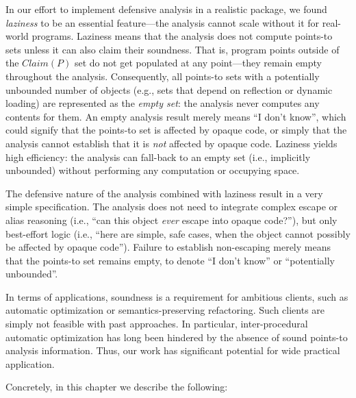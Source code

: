 In our effort to implement defensive analysis in a realistic package, we found \emph{laziness} to be an essential feature---the analysis cannot scale without it for real-world programs. Laziness means that the analysis does not compute points-to sets unless it can also claim their soundness. That is, program points outside of the $Claim(P)$ set do not get populated at any point---they remain empty throughout the analysis. Consequently, all points-to sets with a potentially unbounded number of objects (e.g., sets that depend on reflection or dynamic loading) are represented as the \emph{empty set}: the analysis never computes any contents for them. An empty analysis result merely means ``I don't know'', which could signify that the points-to set is affected by opaque code, or simply that the analysis cannot establish that it is \emph{not} affected by opaque code. Laziness yields high efficiency: the analysis can fall-back to an empty set (i.e., implicitly unbounded) without performing any computation or occupying space. 

The defensive nature of the analysis combined with laziness result in a very simple specification. The analysis does not need to integrate complex escape or alias reasoning (i.e., ``can this object \emph{ever} escape into opaque code?''), but only best-effort logic (i.e., ``here are simple, safe cases, when the object cannot possibly be affected by opaque code''). Failure to establish non-escaping merely means that the points-to set remains empty, to denote ``I don't know'' or ``potentially unbounded''.

In terms of applications, soundness is a requirement for ambitious clients, such as automatic optimization or semantics-preserving refactoring. Such clients are simply not feasible with past approaches. In particular, inter-procedural automatic optimization has long been hindered by the absence of sound points-to analysis information. Thus, our work has significant potential for wide practical application.

Concretely, in this chapter we describe the following:

